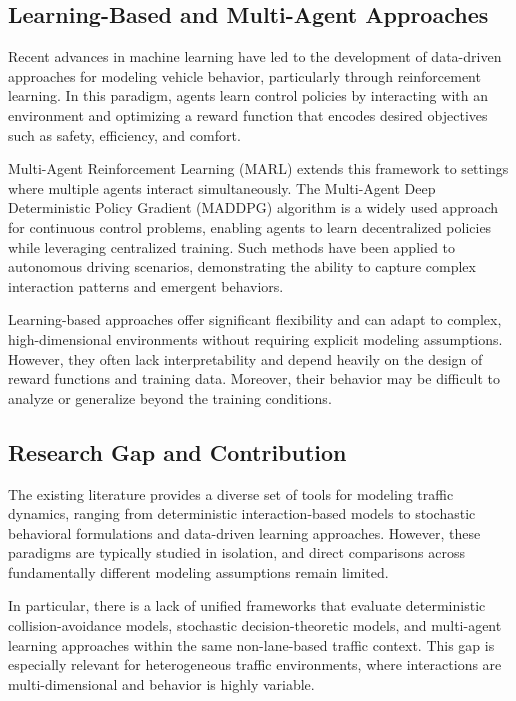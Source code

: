 \documentclass[conference]{IEEEtran}
\begin{document}
\subsection{Learning-Based and Multi-Agent Approaches}
Recent advances in machine learning have led to the development of data-driven approaches for modeling vehicle behavior, particularly through reinforcement learning. In this paradigm, agents learn control policies by interacting with an environment and optimizing a reward function that encodes desired objectives such as safety, efficiency, and comfort.

Multi-Agent Reinforcement Learning (MARL) extends this framework to settings where multiple agents interact simultaneously. The Multi-Agent Deep Deterministic Policy Gradient (MADDPG) algorithm \cite{lowe2017multi} is a widely used approach for continuous control problems, enabling agents to learn decentralized policies while leveraging centralized training. Such methods have been applied to autonomous driving scenarios, demonstrating the ability to capture complex interaction patterns and emergent behaviors.

Learning-based approaches offer significant flexibility and can adapt to complex, high-dimensional environments without requiring explicit modeling assumptions. However, they often lack interpretability and depend heavily on the design of reward functions and training data. Moreover, their behavior may be difficult to analyze or generalize beyond the training conditions.

\subsection{Research Gap and Contribution}
The existing literature provides a diverse set of tools for modeling traffic dynamics, ranging from deterministic interaction-based models to stochastic behavioral formulations and data-driven learning approaches. However, these paradigms are typically studied in isolation, and direct comparisons across fundamentally different modeling assumptions remain limited.

In particular, there is a lack of unified frameworks that evaluate deterministic collision-avoidance models, stochastic decision-theoretic models, and multi-agent learning approaches within the same non-lane-based traffic context. This gap is especially relevant for heterogeneous traffic environments, where interactions are multi-dimensional and behavior is highly variable.
\end{document}
